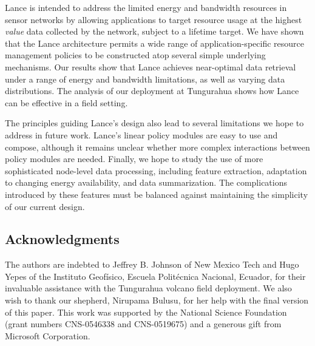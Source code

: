 \documentclass[lettersize]{sig-alternate-konrad}
\begin{document}
Lance is intended to address the limited energy and bandwidth resources in
sensor networks by allowing applications to target resource usage at the
highest {\em value} data collected by the network, subject to a lifetime
target.  We have shown that the Lance architecture permits a wide range of
application-specific resource management policies to be constructed atop
several simple underlying mechanisms. Our results show that Lance achieves
near-optimal data retrieval under a range of energy and bandwidth
limitations, as well as varying data distributions. The analysis of our
deployment at Tungurahua shows how Lance can be effective in a field
setting. 

The principles guiding Lance's design also lead to several limitations we
hope to address in future work.  Lance's linear policy modules are easy to
use and compose, although it remains unclear whether more complex
interactions between policy modules are needed. Finally, we hope to study the
use of more sophisticated node-level data processing, including feature
extraction, adaptation to changing energy availability, and data
summarization.  The complications introduced by these features must be
balanced against maintaining the simplicity of our current design.

\subsection*{Acknowledgments}

The authors are indebted to Jeffrey B. Johnson of New Mexico Tech and 
Hugo Yepes of the Instituto Geof\'{i}sico, Escuela Polit\'{e}cnica
Nacional, Ecuador, for their invaluable assistance with the Tungurahua 
volcano field deployment. We also wish to thank our shepherd, Nirupama
Bulusu, for her help with the final version of this paper. This work was 
supported by the National Science Foundation (grant numbers CNS-0546338 
and CNS-0519675) and a generous gift from Microsoft Corporation.
\end{document}
